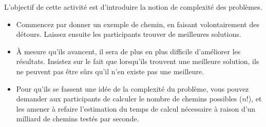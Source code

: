 L'objectif de cette activité est d'introduire la notion de complexité des
problèmes.

\begin{itemize}
\item Commencez par donner un exemple de chemin, en faisant volontairement des
  détours. Laissez ensuite les participants trouver de meilleures solutions.
\item À mesure qu'ils avancent, il sera de plus en plus difficile d'améliorer
  les résultats. Insistez sur le fait que lorsqu'ils trouvent une meilleure
  solution, ils ne peuvent pas être sûrs qu'il n'en existe pas une meilleure.
\item Pour qu'ils se fassent une idée de la complexité du problème, vous pouvez
  demander aux participants de calculer le nombre de chemins possibles ($n!$),
  et les amener à refaire l'estimation du temps de calcul nécessaire à raison
  d'un milliard de chemins testés par seconde.
\end{itemize}


